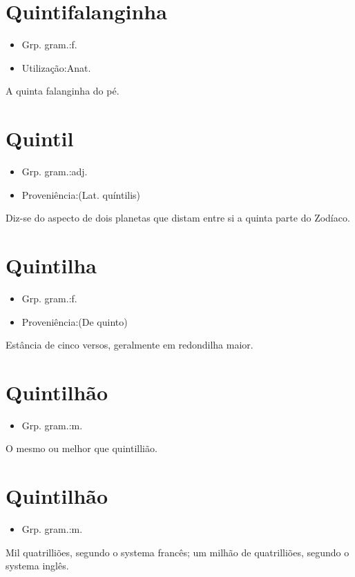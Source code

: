 \section{Quintifalanginha}
\begin{itemize}
\item {Grp. gram.:f.}
\end{itemize}
\begin{itemize}
\item {Utilização:Anat.}
\end{itemize}
A quinta falanginha do pé.
\section{Quintil}
\begin{itemize}
\item {Grp. gram.:adj.}
\end{itemize}
\begin{itemize}
\item {Proveniência:(Lat. \textunderscore quíntilis\textunderscore )}
\end{itemize}
Diz-se do aspecto de dois planetas que distam entre si a quinta parte do Zodíaco.
\section{Quintilha}
\begin{itemize}
\item {Grp. gram.:f.}
\end{itemize}
\begin{itemize}
\item {Proveniência:(De \textunderscore quinto\textunderscore )}
\end{itemize}
Estância de cinco versos, geralmente em redondilha maior.
\section{Quintilhão}
\begin{itemize}
\item {Grp. gram.:m.}
\end{itemize}
O mesmo ou melhor que \textunderscore quintillião\textunderscore .
\section{Quintilhão}
\begin{itemize}
\item {Grp. gram.:m.}
\end{itemize}
Mil quatrilliões, segundo o systema francês; um milhão de quatrilliões, segundo o systema inglês.
